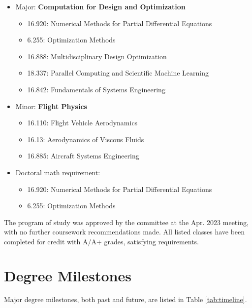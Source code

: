 \documentclass[12pt,vi,oneside]{report}
\begin{document}
    \begin{itemize}[noitemsep]
        \item Major: \textbf{Computation for Design and Optimization}
        \begin{itemize}[noitemsep]
            \item 16.920: Numerical Methods for Partial Differential Equations
            \item 6.255: Optimization Methods
            \item 16.888: Multidisciplinary Design Optimization
            \item 18.337: Parallel Computing and Scientific Machine Learning
            \item 16.842: Fundamentals of Systems Engineering
        \end{itemize}
        \item Minor: \textbf{Flight Physics}
        \begin{itemize}[noitemsep]
            \item 16.110: Flight Vehicle Aerodynamics
            \item 16.13: Aerodynamics of Viscous Fluids
            \item 16.885: Aircraft Systems Engineering
        \end{itemize}
        \item Doctoral math requirement:
        \begin{itemize}[noitemsep]
            \item 16.920: Numerical Methods for Partial Differential Equations
            \item 6.255: Optimization Methods
        \end{itemize}
    \end{itemize}

    \noindent The program of study was approved by the committee at the Apr. 2023 meeting, with no further coursework recommendations made. All listed classes have been completed for credit with A/A+ grades, satisfying requirements.


    \section{Degree Milestones}

    Major degree milestones, both past and future, are listed in Table \ref{tab:timeline}.
\end{document}
